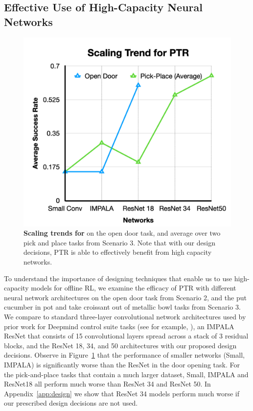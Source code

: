 \subsection{Effective Use of High-Capacity Neural Networks}
\vspace{0.1cm}

\begin{figure}
\centering
\vspace{-0.7cm}
\includegraphics[width=0.6\linewidth]{chapters/ptr/scaling_ptr.pdf}
\vspace{-0.24cm}
\caption{\footnotesize{\label{fig:scaling_ptr} \textbf{Scaling trends for \ptrmethodname} on the open door task, and average over two pick and place tasks from Scenario 3. Note that with our design decisions, PTR is able to effectively benefit from high capacity networks.}}
\vspace{-0.6cm}
\end{figure}
To understand the importance of designing techniques that enable us to use high-capacity models for offline RL, we examine the efficacy of PTR with different neural network architectures on the open door task from Scenario 2, and the put cucumber in pot and take croissant out of metallic bowl tasks from Scenario 3. We compare to standard three-layer convolutional network architectures used by prior work for Deepmind control suite tasks (see for example, \citet{kostrikov2020image}), an IMPALA~\citep{espeholt2018impala} ResNet that consists of 15 convolutional layers spread across a stack of 3 residual blocks, and the ResNet 18, 34, and 50 architectures with our proposed design decisions. Observe in Figure~\ref{fig:scaling_ptr} that the performance of smaller networks (Small, IMPALA) is significantly worse than the ResNet in the door opening task. For the pick-and-place tasks that contain a much larger dataset, Small, IMPALA and ResNet18 all perform much worse than ResNet 34 and ResNet 50. In Appendix~\ref{app:design} we show that ResNet 34 models perform much worse if our prescribed design decisions are not used. 


